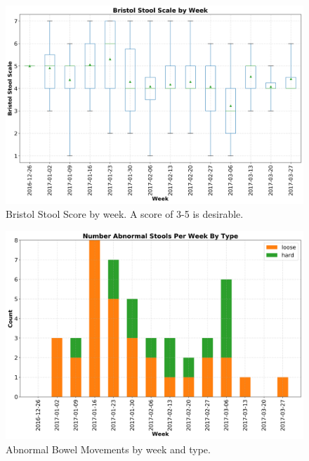 \documentclass[conference]{IEEEtran}
\begin{document}
\begin{figure}[t]
    \centering
    \includegraphics[width=\columnwidth]{bss_box_whisker.png}
    \caption{Bristol Stool Score by week. A score of 3-5 is desirable.}\label{fig:bss_box_whisker}
\end{figure}



\begin{figure}[t]
    \centering
    \includegraphics[width=\columnwidth]{abnormal.png}
    \caption{Abnormal Bowel Movements by week and type.}\label{fig:bss_abnormal}
\end{figure}
\end{document}
